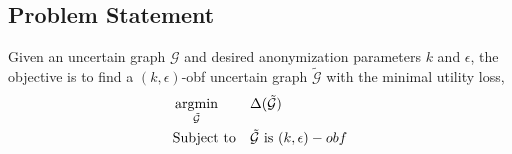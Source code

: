 \subsection{Problem Statement} 
\begin{problem}
     Given an uncertain graph $\mathcal{G}$ and desired anonymization parameters $k$ and $\epsilon$, 
     the objective is to find a  $(k,\epsilon)$-obf uncertain graph $\tilde{\mathcal{G}}$
     with the minimal utility loss,
     \begin{equation*}
             \begin{aligned}
                 & \argmin_{\tilde{
                \mathcal{G}}} & & \Delta(\tilde{\mathcal{G}}) \\
                &  \text{Subject to} & &\tilde{\mathcal{G}} \text{~is~} (k,\epsilon)-obf
            \end{aligned}
     \end{equation*}
     \label{prob:unobf}
\end{problem}
